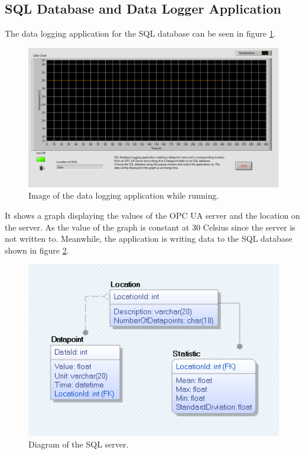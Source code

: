 \documentclass[11pt, A4paper, english]{article}
\numberwithin{equation}{section}
\begin{document}
\begin{multicols}{2}
		\subsection{SQL Database and Data Logger Application}
The data logging application for the SQL database can be seen in figure \ref{fig:datalogger}.
			\begin{figure}[H]
\includegraphics[width=\columnwidth]{Datalogger.png}
\caption{Image of the data logging application while running.}
\label{fig:datalogger}
			\end{figure}
It shows a graph displaying the values of the OPC UA server and the location on the server. As the value of the graph is constant at 30 Celsius since the server is not written to. Meanwhile, the application is writing data to the SQL database shown in figure \ref{fig:SQL diagram}.
				\begin{figure}[H]
\includegraphics[width=\columnwidth]{Diagram.png}
\caption{Diagram of the SQL server.}
\label{fig:SQL diagram}
				\end{figure}

\end{multicols}
\end{document}
